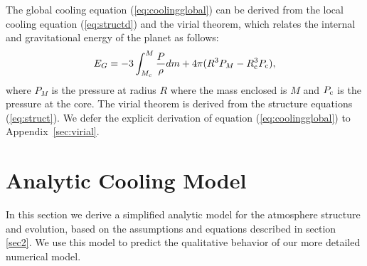 \documentclass[apj]{emulateapj}
\newcommand{\App}[1]{Appendix~\ref{#1}}
\newcommand{\co}{_{\rm c}}
\begin{document}
The global cooling equation (\ref{eq:coolingglobal}) can be derived from the local cooling equation (\ref{eq:structd}) and the virial theorem, which relates the internal and gravitational energy of the planet as follows:
\begin{equation}
\label{eq:virial}
E_G=-3 \int_{M_c}^M \frac{P}{\rho} dm + 4 \pi (R^3 P_M-R\co^3 P\co),
\end{equation}
where $P_M$ is the pressure at radius $R$ where the mass enclosed is $M$ and $P\co$ is the pressure at the core. The virial theorem is derived from the structure equations (\ref{eq:struct}). We defer the explicit derivation of equation (\ref{eq:coolingglobal}) to \App{sec:virial}.





%
%
%




\section{Analytic Cooling Model}
\label{analytic}

In this section we derive a simplified analytic model for the atmosphere structure and evolution, based on the assumptions and equations described in section \ref{sec2}. We use this model to predict the qualitative behavior of our more detailed numerical model. %
\end{document}
